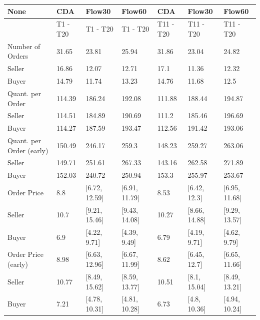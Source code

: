 \begin{tabular}{lllllll}
\hline
 None                     & CDA      & Flow30         & Flow60         & CDA       & Flow30         & Flow60         \\
\hline
                          & T1 - T20 & T1 - T20      & T1 - T20      & T11 - T20 & T11 - T20     & T11 - T20     \\
 Number of Orders         & 31.65    & 23.81         & 25.94         & 31.86     & 23.04         & 24.82         \\
 Seller                   & 16.86    & 12.07         & 12.71         & 17.1      & 11.36         & 12.32         \\
 Buyer                    & 14.79    & 11.74         & 13.23         & 14.76     & 11.68         & 12.5          \\
 Quant. per Order         & 114.39   & 186.24        & 192.08        & 111.88    & 188.44        & 194.87        \\
 Seller                   & 114.51   & 184.89        & 190.69        & 111.2     & 185.46        & 196.69        \\
 Buyer                    & 114.27   & 187.59        & 193.47        & 112.56    & 191.42        & 193.06        \\
 Quant. per Order (early) & 150.49   & 246.17        & 259.3         & 148.23    & 259.27        & 263.06        \\
 Seller                   & 149.71   & 251.61        & 267.33        & 143.16    & 262.58        & 271.89        \\
 Buyer                    & 152.03   & 240.72        & 250.94        & 153.3     & 255.97        & 253.67        \\
 Order Price              & 8.8      & [6.72, 12.59] & [6.91, 11.79] & 8.53      & [6.42, 12.3]  & [6.95, 11.68] \\
 Seller                   & 10.7     & [9.21, 15.46] & [9.43, 14.08] & 10.27     & [8.66, 14.88] & [9.29, 13.57] \\
 Buyer                    & 6.9      & [4.22, 9.71]  & [4.39, 9.49]  & 6.79      & [4.19, 9.71]  & [4.62, 9.79]  \\
 Order Price (early)      & 8.98     & [6.63, 12.96] & [6.67, 11.99] & 8.62      & [6.45, 12.7]  & [6.65, 11.66] \\
 Seller                   & 10.77    & [8.49, 15.62] & [8.59, 13.77] & 10.51     & [8.1, 15.04]  & [8.49, 13.21] \\
 Buyer                    & 7.21     & [4.78, 10.31] & [4.81, 10.28] & 6.73      & [4.8, 10.36]  & [4.94, 10.24] \\

\end{tabular}
